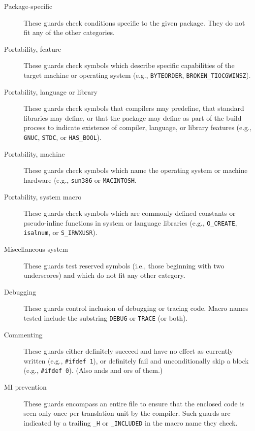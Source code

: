 \begin{description}

\item[Package-specific] These guards check conditions specific
      to the given package.  They do not fit any of the other categories.

\item[Portability, feature] These guards check symbols which
      describe specific capabilities of the target machine or operating
      system (e.g., \texttt{BYTEORDER}, \verb|BROKEN_TIOCGWINSZ|).

\item[Portability, language or library] These guards check
      symbols that compilers may predefine, that standard libraries may
      define, or that the package may define as part of the build
      process to indicate existence of compiler, language, or library
      features (e.g., \texttt{GNUC}, \texttt{STDC}, or \verb|HAS_BOOL|).

\item[Portability, machine] These guards check symbols which
      name the operating system or machine hardware (e.g.,
      \texttt{sun386} or \texttt{MACINTOSH}.
      
\item[Portability, system macro] These guards check symbols
      which are commonly defined constants or pseudo-inline functions in
      system or language libraries (e.g., \verb|O_CREATE|,
      \texttt{isalnum}, or \verb|S_IRWXUSR|).

\item[Miscellaneous system] These guards test reserved symbols
      (i.e., those beginning with two underscores) and which do not
      fit any other category.
      
\item[Debugging] These guards control inclusion of debugging
      or tracing code.  Macro names tested include the
      substring \texttt{DEBUG} or \texttt{TRACE} (or both).
      
\item[Commenting] These guards either definitely succeed and
      have no effect as currently written (e.g., \texttt{\#ifdef 1}), or
      definitely fail and unconditionally skip a block (e.g.,
      \texttt{\#ifdef 0}).  (Also ands and ors of them.)
      
\item[MI prevention] These guards encompass an entire file to
      ensure that the enclosed code is seen only once per translation
      unit by the compiler.  Such guards are indicated by a trailing
      \verb|_H| or \verb|_INCLUDED| in the macro name they check.


\end{description}

